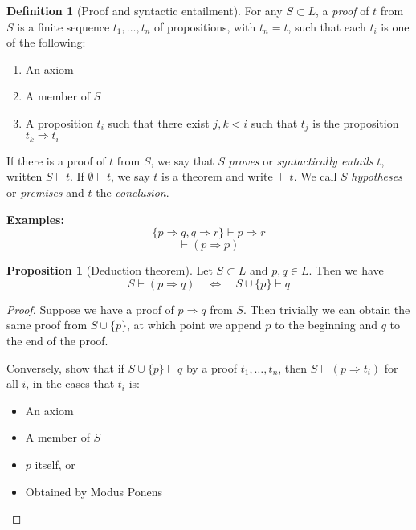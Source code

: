 \documentclass{article}
\theoremstyle{definition}
\newtheorem{definition}{Definition}
\newtheorem{proposition}{Proposition}
\numberwithin{definition}{section}
\newcommand{\proves}{\vdash}
\begin{document}
\begin{definition}[Proof and syntactic entailment]
For any $S \subset L$, a \textit{proof} of $t$ from $S$ is a finite sequence 
  $t_{1},\ldots,t_{n}$ of propositions, with $t_{n}=t$, such that each $t_{i}$ 
  is one of the following:

\begin{enumerate}[i]
  \item An axiom
  \item A member of $S$
  \item A proposition $t_{i}$ such that there exist $j,k<i$ such that $t_{j}$ 
    is the proposition $t_{k} \Rightarrow t_{i}$
\end{enumerate}

\end{definition}
If there is a proof of $t$ from $S$, we say that $S$ \textit{proves} or 
\textit{syntactically entails} $t$, written $S \proves t$. 
If $\emptyset \proves t$, we say $t$ is a theorem and write $\proves t$. 
We call $S$ \textit{hypotheses} or \textit{premises} and $t$ the \textit{conclusion}. 

\textbf{Examples:}
$$\{p \Rightarrow q,q \Rightarrow r\} \proves p \Rightarrow r$$
$$\proves (p \Rightarrow p)$$ 

\begin{proposition}[Deduction theorem]
Let $S \subset L$ and $p,q \in L$. Then we have 
  $$S \proves (p \Rightarrow q) \quad \iff \quad S \cup \{p\} \proves q$$
\end{proposition}

\begin{proof}
Suppose we have a proof of $p \Rightarrow q$ from $S$. Then trivially we can 
  obtain the same proof from $S \cup \{p\}$, at which point we append $p$ to 
  the beginning and $q$ to the end of the proof. 
  
Conversely, show that if $S \cup \{p\} \proves q$ by a proof $t_{1},\ldots,t_{n}$, 
  then $S \proves (p \Rightarrow t_{i})$ for all $i$, in the cases that $t_{i}$ is:
\begin{itemize}
  \item An axiom  %
  \item A member of $S$ %
  \item $p$ itself, or %
  \item Obtained by Modus Ponens %
\end{itemize}
\end{proof}
\end{document}
